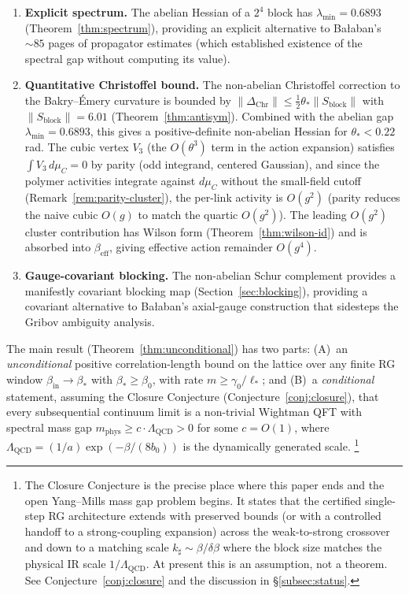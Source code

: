 \documentclass[11pt]{article}
\theoremstyle{definition}
\newcommand{\Lam}{\Lambda_{\mathrm{QCD}}}
\begin{document}
\begin{enumerate}[nosep]
\item \textbf{Explicit spectrum.}
The abelian Hessian of a $2^4$ block has $\lambda_{\min}=0.6893$
(Theorem~\ref{thm:spectrum}), providing an explicit alternative to
Ba\l aban's ${\sim}85$ pages of propagator estimates
(which established existence of the spectral gap without
computing its value).

\item \textbf{Quantitative Christoffel bound.}
The non-abelian Christoffel correction to the Bakry--\'Emery curvature
is bounded by $\|\Delta_{\mathrm{Chr}}\|\le\frac{1}{2}\theta_*\|S_{\mathrm{block}}\|$
with $\|S_{\mathrm{block}}\|=6.01$
(Theorem~\ref{thm:antisym}).  Combined with the abelian gap
$\lambda_{\min}=0.6893$, this gives a positive-definite non-abelian
Hessian for $\theta_*<0.22$\,rad.  The cubic vertex $V_3$
(the $O(\theta^3)$ term in the action expansion) satisfies
$\int V_3\,d\mu_C=0$ by parity (odd integrand, centered Gaussian),
and since the polymer activities integrate against $d\mu_C$ without
the small-field cutoff (Remark~\ref{rem:parity-cluster}), the
per-link activity is $O(g^2)$ (parity reduces the naive cubic
$O(g)$ to match the quartic $O(g^2)$).  The leading $O(g^2)$
cluster contribution has Wilson form (Theorem~\ref{thm:wilson-id}) and is absorbed into
$\beta_{\mathrm{eff}}$, giving effective action remainder $O(g^4)$.

\item \textbf{Gauge-covariant blocking.}
The non-abelian Schur complement provides a manifestly covariant
blocking map (Section~\ref{sec:blocking}), providing a covariant
alternative to Ba\l aban's axial-gauge construction that
sidesteps the Gribov ambiguity analysis.
\end{enumerate}

The main result (Theorem~\ref{thm:unconditional}) has two parts:
(A)~an \emph{unconditional} positive correlation-length bound on
the lattice over any finite RG window $\beta_{\mathrm{in}}\to\beta_*$
with $\beta_*\ge\beta_0$, with rate
$m\ge\gamma_0/\ell_*$; and
(B)~a \emph{conditional} statement, assuming the Closure Conjecture
(Conjecture~\ref{conj:closure}), that every subsequential
continuum limit is a non-trivial Wightman QFT with spectral mass gap
$m_{\mathrm{phys}}\ge c\cdot\Lam>0$ for some $c=O(1)$, where
$\Lam=(1/a)\exp(-\beta/(8b_0))$ is the dynamically generated scale.%
\footnote{The Closure Conjecture is the precise place where this paper
ends and the open Yang--Mills mass gap problem begins.  It states
that the certified single-step RG architecture extends with
preserved bounds (or with a controlled handoff to a strong-coupling
expansion) across the weak-to-strong crossover and down to a matching
scale $k_\sharp\sim\beta/\delta\beta$ where the block size matches
the physical IR scale $1/\Lam$.  At present this is an assumption,
not a theorem.  See Conjecture~\ref{conj:closure} and the discussion
in \S\ref{subsec:status}.}
\end{document}
